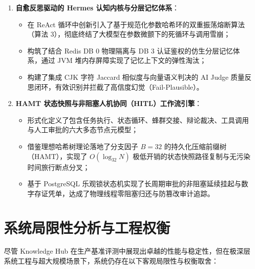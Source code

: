 \begin{enumerate}
    \item \textbf{自愈反思驱动的 Hermes 认知内核与分层记忆体系}：
    \begin{itemize}
        \item 在 ReAct 循环中创新引入了基于规范化参数哈希环的双重振荡熔断算法（算法 3），彻底终结了大模型在参数微颤下的死循环与调用雪崩；
        \item 构筑了结合 Redis DB 0 物理隔离与 DB 3 认证鉴权的仿生分层记忆体系，通过 JVM 堆内存屏障实现了记忆上下文的弹性淘汰；
        \item 构建了集成 CJK 字符 Jaccard 相似度与向量语义判决的 AI Judge 质量反思闭环，有效识别并拦截了高信度幻觉（Fail-Plausible）。
    \end{itemize}

    \item \textbf{HAMT 状态快照与非阻塞人机协同（HITL）工作流引擎}：
    \begin{itemize}
        \item 形式化定义了包含任务执行、状态循环、蜂群交接、辩论裁决、工具调用与人工审批的六大多态节点元模型；
        \item 借鉴理想哈希树理论落地了分支因子 $B=32$ 的持久化压缩前缀树（HAMT），实现了 $O(\log_{32} N)$ 极低开销的状态快照路径复制与无污染时间旅行断点分叉；
        \item 基于 PostgreSQL 乐观锁状态机实现了长周期审批的非阻塞延续挂起与数字存证凭单，达成了物理线程零阻塞归还与防篡改审计追踪。
    \end{itemize}
\end{enumerate}

\section{系统局限性分析与工程权衡}

尽管 Knowledge Hub 在生产基准评测中展现出卓越的性能与稳定性，但在极深层系统工程与超大规模场景下，系统仍存在以下客观局限性与权衡取舍：

